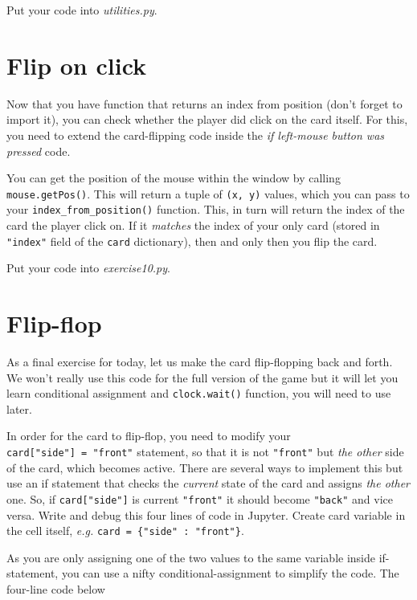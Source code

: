 \documentclass[
]{book}
\begin{document}
Put your code into \emph{utilities.py}.

\hypertarget{flip-on-click}{%
\section{Flip on click}\label{flip-on-click}}

Now that you have function that returns an index from position (don't forget to import it), you can check whether the player did click on the card itself. For this, you need to extend the card-flipping code inside the \emph{if left-mouse button was pressed} code.

You can get the position of the mouse within the window by calling \texttt{mouse.getPos()}. This will return a tuple of \texttt{(x,\ y)} values, which you can pass to your \texttt{index\_from\_position()} function. This, in turn will return the index of the card the player click on. If it \emph{matches} the index of your only card (stored in \texttt{"index"} field of the \texttt{card} dictionary), then and only then you flip the card.

Put your code into \emph{exercise10.py}.

\hypertarget{flip-flop}{%
\section{Flip-flop}\label{flip-flop}}

As a final exercise for today, let us make the card flip-flopping back and forth. We won't really use this code for the full version of the game but it will let you learn conditional assignment and \texttt{clock.wait()} function, you will need to use later.

In order for the card to flip-flop, you need to modify your \texttt{card{[}"side"{]}\ =\ "front"} statement, so that it is not \texttt{"front"} but \emph{the other} side of the card, which becomes active. There are several ways to implement this but use an if statement that checks the \emph{current} state of the card and assigns \emph{the other} one. So, if \texttt{card{[}"side"{]}} is current \texttt{"front"} it should become \texttt{"back"} and vice versa. Write and debug this four lines of code in Jupyter. Create card variable in the cell itself, \emph{e.g.} \texttt{card\ =\ \{"side"\ :\ "front"\}}.

As you are only assigning one of the two values to the same variable inside if-statement, you can use a nifty conditional-assignment to simplify the code. The four-line code below
\end{document}
